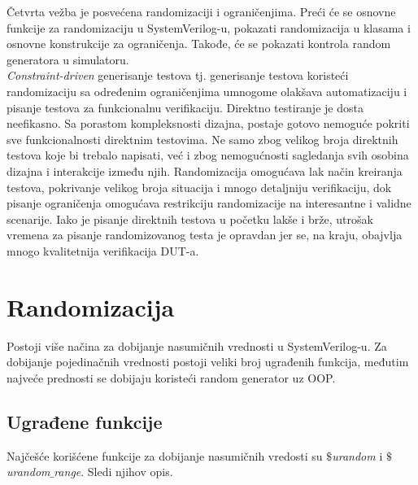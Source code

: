 %
% 

Četvrta vežba je posvećena randomizaciji i ograničenjima. Preći će se osnovne
funkcije za randomizaciju u SystemVerilog-u, pokazati randomizacija u klasama i
osnovne konstrukcije za ograničenja. Takođe, će se pokazati kontrola random
generatora u simulatoru.\\

\emph{Constraint-driven} generisanje testova tj. generisanje testova koristeći
randomizaciju sa određenim ograničenjima umnogome olakšava automatizaciju i
pisanje testova za funkcionalnu verifikaciju. Direktno testiranje je dosta
neefikasno. Sa porastom kompleksnosti dizajna, postaje gotovo nemoguće pokriti
sve funkcionalnosti direktnim testovima. Ne samo zbog velikog broja direktnih
testova koje bi trebalo napisati, već i zbog nemogućnosti sagledanja svih
osobina dizajna i interakcije između njih. Randomizacija omogućava lak način
kreiranja testova, pokrivanje velikog broja situacija i mnogo detaljniju
verifikaciju, dok pisanje ograničenja omogućava restrikciju randomizacije na
interesantne i validne scenarije. Iako je pisanje direktnih testova u početku
lakše i brže, utrošak vremena za pisanje randomizovanog testa je opravdan jer
se, na kraju, obajvlja mnogo kvalitetnija verifikacija DUT-a.


\section{Randomizacija}

Postoji više načina za dobijanje nasumičnih vrednosti u SystemVerilog-u. Za
dobijanje pojedinačnih vrednosti postoji veliki broj ugrađenih funkcija,
međutim najveće prednosti se dobijaju koristeći random generator uz OOP.


\subsection{Ugrađene funkcije}

Najčešće korišćene funkcije za dobijanje nasumičnih vredosti su
\emph{\(\$\)urandom} i \emph{\(\$\)urandom\(\_\)range}. Sledi njihov opis.

